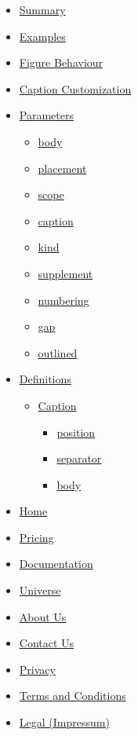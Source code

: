 \begin{itemize}
\tightlist
\item
  \hyperref[summary]{Summary}
\item
  \hyperref[examples]{Examples}
\item
  \hyperref[figure-behaviour]{Figure Behaviour}
\item
  \hyperref[caption-customization]{Caption Customization}
\item
  \hyperref[parameters]{Parameters}

  \begin{itemize}
  \tightlist
  \item
    \hyperref[parameters-body]{body}
  \item
    \hyperref[parameters-placement]{placement}
  \item
    \hyperref[parameters-scope]{scope}
  \item
    \hyperref[parameters-caption]{caption}
  \item
    \hyperref[parameters-kind]{kind}
  \item
    \hyperref[parameters-supplement]{supplement}
  \item
    \hyperref[parameters-numbering]{numbering}
  \item
    \hyperref[parameters-gap]{gap}
  \item
    \hyperref[parameters-outlined]{outlined}
  \end{itemize}
\item
  \hyperref[definitions]{Definitions}

  \begin{itemize}
  \tightlist
  \item
    \hyperref[definitions-caption]{Caption}

    \begin{itemize}
    \tightlist
    \item
      \hyperref[definitions-caption-position]{position}
    \item
      \hyperref[definitions-caption-separator]{separator}
    \item
      \hyperref[definitions-caption-body]{body}
    \end{itemize}
  \end{itemize}
\end{itemize}

\begin{itemize}
\tightlist
\item
  \href{/}{Home}
\item
  \href{/pricing/}{Pricing}
\item
  \href{/docs/}{Documentation}
\item
  \href{/universe/}{Universe}
\item
  \href{/about/}{About Us}
\item
  \href{/contact/}{Contact Us}
\item
  \href{/privacy/}{Privacy}
\item
  \href{https://typst.app/terms}{Terms and Conditions}
\item
  \href{/legal/}{Legal (Impressum)}
\end{itemize}

